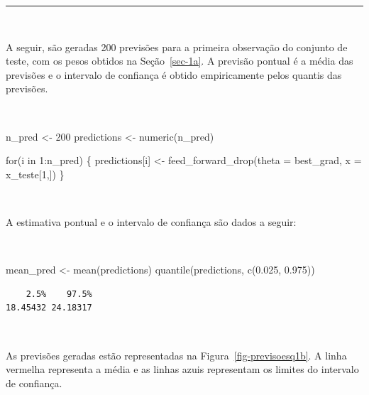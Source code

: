 \documentclass[
  a4paperpaper,
]{article}
\newenvironment{Shaded}{\begin{snugshade}}{\end{snugshade}}
\newcommand{\AttributeTok}[1]{\textcolor[rgb]{0.40,0.45,0.13}{#1}}
\newcommand{\ControlFlowTok}[1]{\textcolor[rgb]{0.00,0.23,0.31}{#1}}
\newcommand{\DecValTok}[1]{\textcolor[rgb]{0.68,0.00,0.00}{#1}}
\newcommand{\FloatTok}[1]{\textcolor[rgb]{0.68,0.00,0.00}{#1}}
\newcommand{\FunctionTok}[1]{\textcolor[rgb]{0.28,0.35,0.67}{#1}}
\newcommand{\NormalTok}[1]{\textcolor[rgb]{0.00,0.23,0.31}{#1}}
\newcommand{\OtherTok}[1]{\textcolor[rgb]{0.00,0.23,0.31}{#1}}
\newcommand{\SpecialCharTok}[1]{\textcolor[rgb]{0.37,0.37,0.37}{#1}}
\begin{document}
\begin{center}\rule{0.5\linewidth}{0.5pt}\end{center}

~

A seguir, são geradas 200 previsões para a primeira observação do
conjunto de teste, com os pesos obtidos na Seção~\ref{sec-1a}. A
previsão pontual é a média das previsões e o intervalo de confiança é
obtido empiricamente pelos quantis das previsões.

~

\begin{Shaded}
\begin{Highlighting}[]
\NormalTok{n\_pred }\OtherTok{\textless{}{-}} \DecValTok{200}
\NormalTok{predictions }\OtherTok{\textless{}{-}} \FunctionTok{numeric}\NormalTok{(n\_pred)}

\ControlFlowTok{for}\NormalTok{(i }\ControlFlowTok{in} \DecValTok{1}\SpecialCharTok{:}\NormalTok{n\_pred) \{}
\NormalTok{  predictions[i] }\OtherTok{\textless{}{-}} \FunctionTok{feed\_forward\_drop}\NormalTok{(}\AttributeTok{theta =}\NormalTok{ best\_grad, }\AttributeTok{x =}\NormalTok{ x\_teste[}\DecValTok{1}\NormalTok{,])}
\NormalTok{\}}
\end{Highlighting}
\end{Shaded}

~

A estimativa pontual e o intervalo de confiança são dados a seguir:

~

\begin{Shaded}
\begin{Highlighting}[]
\NormalTok{mean\_pred }\OtherTok{\textless{}{-}} \FunctionTok{mean}\NormalTok{(predictions)}
\FunctionTok{quantile}\NormalTok{(predictions, }\FunctionTok{c}\NormalTok{(}\FloatTok{0.025}\NormalTok{, }\FloatTok{0.975}\NormalTok{))}
\end{Highlighting}
\end{Shaded}

\begin{verbatim}
    2.5%    97.5% 
18.45432 24.18317 
\end{verbatim}

~

As previsões geradas estão representadas na
Figura~\ref{fig-previsoesq1b}. A linha vermelha representa a média e as
linhas azuis representam os limites do intervalo de confiança.

~
\end{document}
